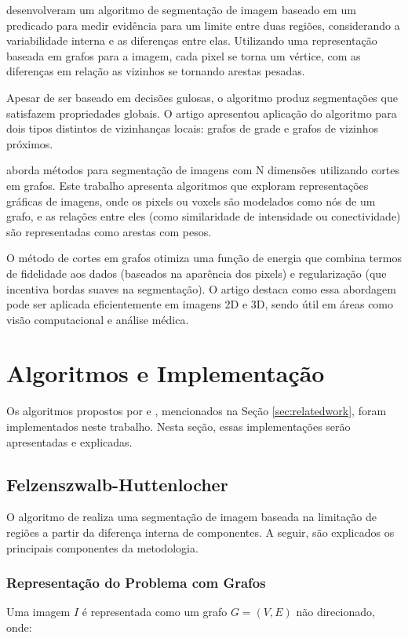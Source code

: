\documentclass[12pt]{article}
\begin{document}
\cite{Felzenszwalb2004} desenvolveram um algoritmo de segmentação de imagem baseado em um predicado para medir evidência para um limite entre duas regiões, considerando a variabilidade interna e as diferenças entre elas. Utilizando uma representação baseada em grafos para a imagem, cada pixel se torna um vértice, com as diferenças em relação as vizinhos se tornando arestas pesadas.

Apesar de ser baseado em decisões gulosas, o algoritmo produz segmentações que satisfazem propriedades globais. O artigo apresentou aplicação do algoritmo para dois tipos distintos de vizinhanças locais: grafos de grade e grafos de vizinhos próximos.

\cite{boykov:06} aborda métodos para segmentação de imagens com N dimensões utilizando cortes em grafos. Este trabalho apresenta algoritmos que exploram representações gráficas de imagens, onde os pixels ou voxels são modelados como nós de um grafo, e as relações entre eles (como similaridade de intensidade ou conectividade) são representadas como arestas com pesos. 

O método de cortes em grafos otimiza uma função de energia que combina termos de fidelidade aos dados (baseados na aparência dos pixels) e regularização (que incentiva bordas suaves na segmentação). O artigo destaca como essa abordagem pode ser aplicada eficientemente em imagens 2D e 3D, sendo útil em áreas como visão computacional e análise médica.

\section{Algoritmos e Implementação} \label{sec:algorithms}
Os algoritmos propostos por \cite{Felzenszwalb2004} e \cite{boykov:06}, mencionados na Seção \ref{sec:relatedwork}, foram implementados neste trabalho. Nesta seção, essas implementações serão apresentadas e explicadas.

\subsection{Felzenszwalb-Huttenlocher} \label{subsec:afh}
O algoritmo de \cite{Felzenszwalb2004} realiza uma segmentação de imagem baseada na limitação de regiões a partir da diferença interna de componentes. A seguir, são explicados os principais componentes da metodologia.

\subsubsection{Representação do Problema com Grafos}
Uma imagem $I$ é representada como um grafo $G = (V, E)$ não direcionado, onde:
\end{document}
